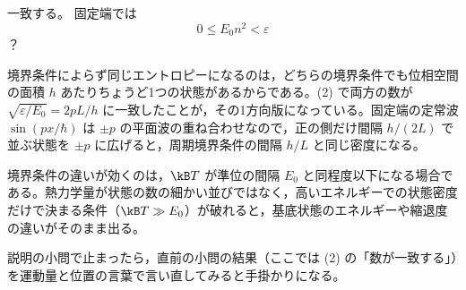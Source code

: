 一致する。
固定端では
\[ 0\le E_{0}n^{2}<\varepsilon \]
？
\item 境界条件によらず同じエントロピーになるのは，どちらの境界条件でも位相空間の面積 $h$ あたりちょうど1つの状態があるからである。(2) で両方の数が $\sqrt{\varepsilon/E_{0}}=2pL/h$ に一致したことが，その1方向版になっている。固定端の定常波 $\sin(px/\hbar)$ は $\pm p$ の平面波の重ね合わせなので，正の側だけ間隔 $h/(2L)$ で並ぶ状態を $\pm p$ に広げると，周期境界条件の間隔 $h/L$ と同じ密度になる。
\item 境界条件の違いが効くのは，$\kB T$ が準位の間隔 $E_{0}$ と同程度以下になる場合である。熱力学量が状態の数の細かい並びではなく，高いエネルギーでの状態密度だけで決まる条件（$\kB T\gg E_{0}$）が破れると，基底状態のエネルギーや縮退度の違いがそのまま出る。
\item 説明の小問で止まったら，直前の小問の結果（ここでは (2) の「数が一致する」）を運動量と位置の言葉で言い直してみると手掛かりになる。
